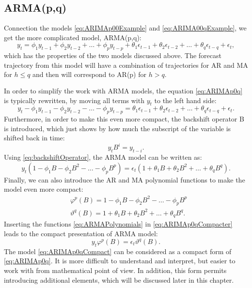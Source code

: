 \documentclass[
]{book}
\theoremstyle{definition}
\theoremstyle{definition}
\theoremstyle{definition}
\theoremstyle{definition}
\theoremstyle{remark}
\begin{document}
\hypertarget{ARMA}{%
\subsection{ARMA(p,q)}\label{ARMA}}

Connection the models \eqref{eq:ARIMAp00Example} and \eqref{eq:ARIMA00qExample}, we get the more complicated model, ARMA(p,q):
\begin{equation}
  {y}_{t} = \phi_1 y_{t-1} + \phi_2 y_{t-2} + \dots + \phi_p y_{t-p} + \theta_1 \epsilon_{t-1} + \theta_2 \epsilon_{t-2} + \dots + \theta_q \epsilon_{t-q} + \epsilon_t ,
  \label{eq:ARIMAp0q}
\end{equation}
which has the properties of the two models discussed above. The forecast trajectory from this model will have a combination of trajectories for AR and MA for \(h \leq q\) and then will correspond to AR(p) for \(h>q\).

In order to simplify the work with ARMA models, the equation \eqref{eq:ARIMAp0q} is typically rewritten, by moving all terms with \(y_t\) to the left hand side:
\begin{equation}
  {y}_{t} - \phi_1 y_{t-1} - \phi_2 y_{t-2} - \dots - \phi_p y_{t-p} = \theta_1 \epsilon_{t-1} + \theta_2 \epsilon_{t-2} + \dots + \theta_q \epsilon_{t-q} + \epsilon_t .
  \label{eq:ARIMAp0qLeft}
\end{equation}
Furthermore, in order to make this even more compact, the backshift operator B is introduced, which just shows by how much the subscript of the variable is shifted back in time:
\begin{equation}
  {y}_{t} B^i = {y}_{t-i}.
  \label{eq:backshiftOperator}
\end{equation}
Using \eqref{eq:backshiftOperator}, the ARMA model can be written as:
\begin{equation}
  {y}_{t} (1 - \phi_1 B - \phi_2 B^2 - \dots - \phi_p B^p) = \epsilon_t (1 + \theta_1 B + \theta_2 B^2 + \dots + \theta_q B^q) .
  \label{eq:ARIMAp0qCompacter}
\end{equation}
Finally, we can also introduce the AR and MA polynomial functions to make the model even more compact:
\begin{equation}
\begin{aligned}
  & \varphi^p(B) = 1 - \phi_1 B - \phi_2 B^2 - \dots - \phi_p B^p \\ 
  & \vartheta^q(B) = 1 + \theta_1 B + \theta_2 B^2 + \dots + \theta_q B^q .
\end{aligned}
  \label{eq:ARMAPolynomials}
\end{equation}
Inserting the functions \eqref{eq:ARMAPolynomials} in \eqref{eq:ARIMAp0qCompacter} leads to the compact presentation of ARMA model:
\begin{equation}
  {y}_{t} \varphi^p(B) = \epsilon_t \vartheta^q(B) .
  \label{eq:ARIMAp0qCompact}
\end{equation}
The model \eqref{eq:ARIMAp0qCompact} can be considered as a compact form of \eqref{eq:ARIMAp0q}. It is more difficult to understand and interpret, but easier to work with from mathematical point of view. In addition, this form permits introducing additional elements, which will be discussed later in this chapter.
\end{document}
